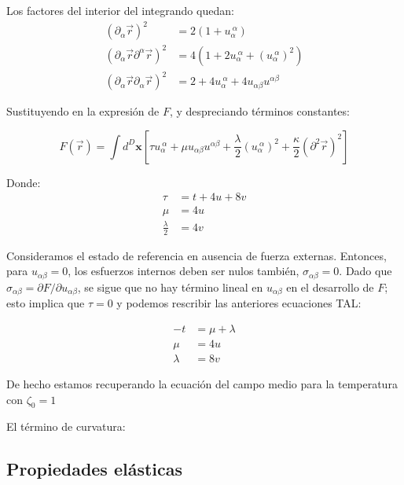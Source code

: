 Los factores del interior del integrando quedan:
\begin{align}
(\partial_{\alpha}\vec{r})^2&=2(1+u_{\alpha}^{\ \alpha})\\
(\partial_{\alpha}\vec{r}\partial^{\alpha}\vec{r})^2&=4(1+2u_{\alpha}^{\
  \alpha}+(u_{\alpha}^{\ \alpha})^2)\\
(\partial_{\alpha}\vec{r}\partial_{\alpha}\vec{r})^2&=2+4u_{\alpha}^{\
  \alpha}+4u_{\alpha\beta}u^{\alpha\beta}
\end{align}

Sustituyendo en la expresión de $F$, y despreciando términos constantes:

\begin{equation*}
F(\vec{r})=\int d^D\mathbf{x}
\left[\tau u_{\alpha}^{\ \alpha}+
\mu u_{\alpha\beta}u^{\alpha\beta} +
\frac{\lambda}{2}(u_{\alpha}^{\ \alpha})^2 +
\frac{\kappa}{2}(\partial^2\vec{r})^2\right]
\end{equation*}

Donde:
\begin{align}
\tau&=t+4u+8v\\
\mu&=4u\\
\frac{\lambda}{2}&=4v
\end{align}

Consideramos el estado de referencia en ausencia de fuerza externas. Entonces,
para $u_{\alpha\beta}=0$, los esfuerzos internos deben ser nulos también,
$\sigma_{\alpha\beta}=0$. Dado que $\sigma_{\alpha\beta}=\partial F / \partial
u_{\alpha\beta}$, se sigue que no hay término lineal en $u_{\alpha\beta}$ en
el desarrollo de $F$; esto implica que $\tau=0$ y podemos rescribir las
anteriores ecuaciones TAL:

\begin{align}
-t&=\mu+\lambda\\
\mu&=4u\\
\lambda&=8v
\end{align}   

De hecho estamos recuperando la ecuación del campo medio para la temperatura
con $\zeta_0=1$

El término de curvatura:

\subsection{Propiedades elásticas}
